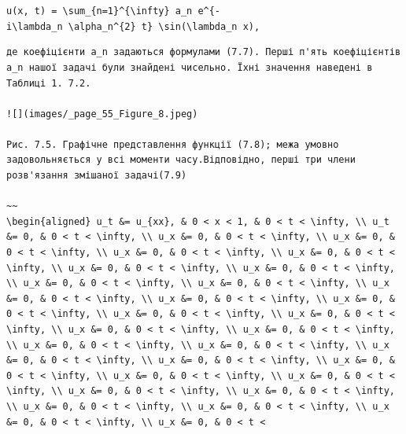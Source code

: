 \documentclass[
  ukrainian,
]{article}
\begin{document}
\texttt{u(x,\ t)\ =\ \textbackslash{}sum\_\{n=1\}\^{}\{\textbackslash{}infty\}\ a\_n\ e\^{}\{-i\textbackslash{}lambda\_n\ \textbackslash{}alpha\_n\^{}\{2\}\ t\}\ \textbackslash{}sin(\textbackslash{}lambda\_n\ x),}

\begin{verbatim}
де коефіцієнти a_n задаються формулами (7.7). Перші п'ять коефіцієнтів a_n нашої задачі були знайдені чисельно. Їхні значення наведені в Таблиці 1. 7.2.

![](images/_page_55_Figure_8.jpeg)

Рис. 7.5. Графічне представлення функції (7.8); межа умовно задовольняється у всі моменти часу.Відповідно, перші три члени розв'язання змішаної задачі(7.9)

~~
\begin{aligned} u_t &= u_{xx}, & 0 < x < 1, & 0 < t < \infty, \\ u_t &= 0, & 0 < t < \infty, \\ u_x &= 0, & 0 < t < \infty, \\ u_x &= 0, & 0 < t < \infty, \\ u_x &= 0, & 0 < t < \infty, \\ u_x &= 0, & 0 < t < \infty, \\ u_x &= 0, & 0 < t < \infty, \\ u_x &= 0, & 0 < t < \infty, \\ u_x &= 0, & 0 < t < \infty, \\ u_x &= 0, & 0 < t < \infty, \\ u_x &= 0, & 0 < t < \infty, \\ u_x &= 0, & 0 < t < \infty, \\ u_x &= 0, & 0 < t < \infty, \\ u_x &= 0, & 0 < t < \infty, \\ u_x &= 0, & 0 < t < \infty, \\ u_x &= 0, & 0 < t < \infty, \\ u_x &= 0, & 0 < t < \infty, \\ u_x &= 0, & 0 < t < \infty, \\ u_x &= 0, & 0 < t < \infty, \\ u_x &= 0, & 0 < t < \infty, \\ u_x &= 0, & 0 < t < \infty, \\ u_x &= 0, & 0 < t < \infty, \\ u_x &= 0, & 0 < t < \infty, \\ u_x &= 0, & 0 < t < \infty, \\ u_x &= 0, & 0 < t < \infty, \\ u_x &= 0, & 0 < t < \infty, \\ u_x &= 0, & 0 < t < \infty, \\ u_x &= 0, & 0 < t < \infty, \\ u_x &= 0, & 0 < t < \infty, \\ u_x &= 0, & 0 < t < 
\end{verbatim}
\end{document}
